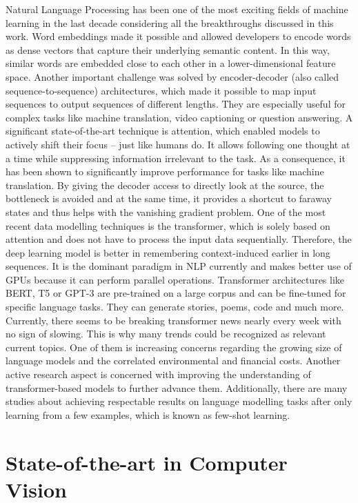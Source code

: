 \documentclass[
]{krantz}
\begin{document}
Natural Language Processing has been one of the most exciting fields of
machine learning in the last decade considering all the breakthroughs
discussed in this work. Word embeddings made it possible and allowed
developers to encode words as dense vectors that capture their
underlying semantic content. In this way, similar words are embedded
close to each other in a lower-dimensional feature space. Another
important challenge was solved by encoder-decoder (also called
sequence-to-sequence) architectures, which made it possible to map input
sequences to output sequences of different lengths. They are especially
useful for complex tasks like machine translation, video captioning or
question answering. A significant state-of-the-art technique is
attention, which enabled models to actively shift their focus -- just
like humans do. It allows following one thought at a time while
suppressing information irrelevant to the task. As a consequence, it has
been shown to significantly improve performance for tasks like machine
translation. By giving the decoder access to directly look at the
source, the bottleneck is avoided and at the same time, it provides a
shortcut to faraway states and thus helps with the vanishing gradient
problem. One of the most recent data modelling techniques is the
transformer, which is solely based on attention and does not have to
process the input data sequentially. Therefore, the deep learning model
is better in remembering context-induced earlier in long sequences. It
is the dominant paradigm in NLP currently and makes better use of GPUs
because it can perform parallel operations. Transformer architectures
like BERT, T5 or GPT-3 are pre-trained on a large corpus and can be
fine-tuned for specific language tasks. They can generate stories,
poems, code and much more. Currently, there seems to be breaking
transformer news nearly every week with no sign of slowing. This is why
many trends could be recognized as relevant current topics. One of them
is increasing concerns regarding the growing size of language models and
the correlated environmental and financial costs. Another active
research aspect is concerned with improving the understanding of
transformer-based models to further advance them. Additionally, there
are many studies about achieving respectable results on language
modelling tasks after only learning from a few examples, which is known
as few-shot learning.

\hypertarget{c01-02-sota-cv}{%
\section{State-of-the-art in Computer Vision}\label{c01-02-sota-cv}}
\end{document}
